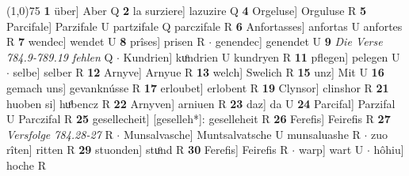 \documentclass[8pt,a4paper,notitlepage]{article}
\begin{document}
\begin{table}[ht]
\begin{minipage}[t]{0.5\linewidth}
\line(1,0){75} \newline
\textbf{1} über] Aber Q \textbf{2} la surziere] lazuzire Q \textbf{4} Orgeluse] Orguluse R \textbf{5} Parcifale] Parzifale U partzifale Q parczifale R \textbf{6} Anfortasses] anfortas U anfortes R \textbf{7} wendec] wendet U \textbf{8} prîses] prisen R  $\cdot$ genendec] genendet U \textbf{9} \textit{Die Verse 784.9-789.19 fehlen} Q   $\cdot$ Kundrien] kuͦndrien U kundryen R \textbf{11} pflegen] pelegen U  $\cdot$ selbe] selber R \textbf{12} Arnyve] Arnyue R \textbf{13} welch] Swelich R \textbf{15} unz] Mit U \textbf{16} gemach uns] gevanknússe R \textbf{17} erloubet] erlobent R \textbf{19} Clynsor] clinshor R \textbf{21} huoben si] huͦbencz R \textbf{22} Arnyven] arniuen R \textbf{23} daz] da U \textbf{24} Parcifal] Parzifal U Parczifal R \textbf{25} gesellecheit] [geselleh*]: geselleheit R \textbf{26} Ferefis] Feirefis R \textbf{27} \textit{Versfolge 784.28-27} R   $\cdot$ Munsalvasche] Muntsalvatsche U munsaluashe R  $\cdot$ zuo rîten] ritten R \textbf{29} stuonden] stuͦnd R \textbf{30} Ferefis] Feirefis R  $\cdot$ warp] wart U  $\cdot$ hôhiu] hoche R \newline
\end{minipage}
\end{table}
\end{document}
